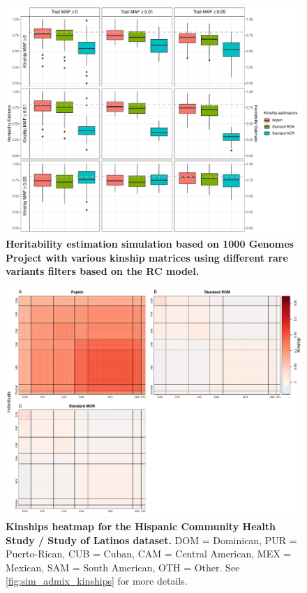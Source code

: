 \documentclass[11pt]{article}
\begin{document}
\begin{figure}[bp!]
  \centering
  \includegraphics[width=\textwidth]{data/tgp_sim_rc.pdf}
  \caption{
    {\bf Heritability estimation simulation based on 1000 Genomes Project with various kinship matrices using different rare variants filters based on the RC model.}
    }
  \label{fig:tgp_sim_rc}
\end{figure}

\begin{figure}[bp!]
  \centering
  \includegraphics[width=\textwidth]{data/SFig_HCHS_All_maf001_kinships.pdf}
  \caption{
    {\bf Kinships heatmap for the Hispanic Community Health Study / Study of Latinos dataset.} DOM = Dominican, PUR = Puerto-Rican, CUB = Cuban, CAM = Central American, MEX = Mexican, SAM = South American, OTH = Other.
    See \cref{fig:sim_admix_kinships} for more details.
    }
  \label{fig:HCHS_kinships}
\end{figure}
\end{document}
